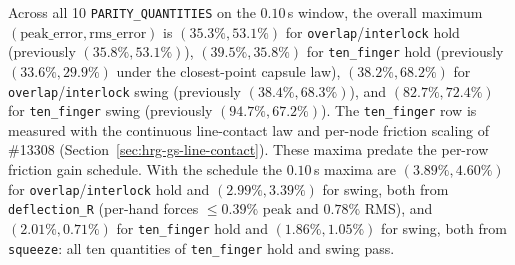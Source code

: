 \documentclass[11pt,a4paper]{article}
\begin{document}
Across all 10 \texttt{PARITY\_QUANTITIES} on the $0.10$\,s window, the overall maximum $(\text{peak\_error}, \text{rms\_error})$ is $(35.3\%, 53.1\%)$ for \texttt{overlap}/\texttt{interlock} hold (previously $(35.8\%, 53.1\%)$), $(39.5\%, 35.8\%)$ for \texttt{ten\_finger} hold (previously $(33.6\%, 29.9\%)$ under the closest-point capsule law), $(38.2\%, 68.2\%)$ for \texttt{overlap}/\texttt{interlock} swing (previously $(38.4\%, 68.3\%)$), and $(82.7\%, 72.4\%)$ for \texttt{ten\_finger} swing (previously $(94.7\%, 67.2\%)$). The \texttt{ten\_finger} row is measured with the continuous line-contact law and per-node friction scaling of \#13308 (Section~\ref{sec:hrg-gs-line-contact}).
These maxima predate the per-row friction gain schedule. With the schedule the $0.10$\,s maxima are $(3.89\%, 4.60\%)$ for
\texttt{overlap}/\texttt{interlock} hold and $(2.99\%, 3.39\%)$ for swing, both from \texttt{deflection\_R} (per-hand forces
$\le 0.39\%$ peak and $0.78\%$ RMS), and $(2.01\%, 0.71\%)$ for \texttt{ten\_finger} hold and $(1.86\%, 1.05\%)$ for swing, both
from \texttt{squeeze}: all ten quantities of \texttt{ten\_finger} hold and swing pass.
\end{document}
